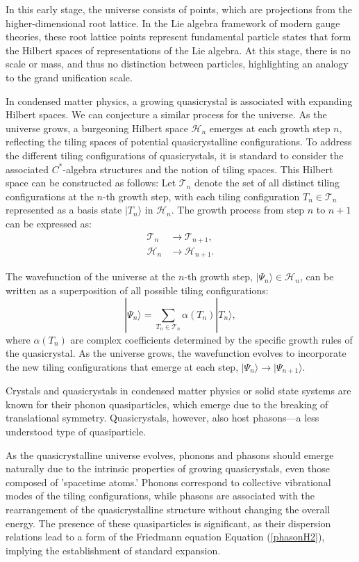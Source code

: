 \documentclass[sn-mathphys-num]{sn-jnl}%
\begin{document}
In this early stage, the universe consists of points, which are projections from the higher-dimensional root lattice. In the Lie algebra framework of modern gauge theories, these root lattice points represent fundamental particle states that form the Hilbert spaces of representations of the Lie algebra. At this stage, there is no scale or mass, and thus no distinction between particles, highlighting an analogy to the grand unification scale.

In condensed matter physics, a growing quasicrystal is associated with expanding Hilbert spaces. We can conjecture a similar process for the universe. As the universe grows, a burgeoning Hilbert space $\mathcal{H}_n$ emerges at each growth step $n$, reflecting the tiling spaces \cite{sadun2018} of potential quasicrystalline configurations. To address the different tiling configurations of quasicrystals, it is standard to consider the associated \( C^* \)-algebra structures \cite{Connes} and the notion of tiling spaces. This Hilbert space can be constructed as follows: Let $\mathcal{T}_n$ denote the set of all distinct tiling configurations at the $n$-th growth step, with each tiling configuration $T_n \in \mathcal{T}_n$ represented as a basis state $|T_n\rangle$ in $\mathcal{H}_n$. The growth process from step $n$ to $n+1$ can be expressed as:
\begin{align}
\mathcal{T}_n &\rightarrow \mathcal{T}_{n+1}, \\
\mathcal{H}_n &\rightarrow \mathcal{H}_{n+1}.
\end{align}

The wavefunction of the universe at the $n$-th growth step, $|\Psi_n\rangle \in \mathcal{H}_n$, can be written as a superposition of all possible tiling configurations:
\begin{equation}
|\Psi_n\rangle = \sum_{T_n \in \mathcal{T}_n} \alpha(T_n) |T_n\rangle,
\end{equation}
where $\alpha(T_n)$ are complex coefficients determined by the specific growth rules of the quasicrystal. As the universe grows, the wavefunction evolves to incorporate the new tiling configurations that emerge at each step, $|\Psi_n\rangle \rightarrow |\Psi_{n+1}\rangle$.


Crystals and quasicrystals in condensed matter physics or solid state systems are known for their phonon quasiparticles, which emerge due to the breaking of translational symmetry. Quasicrystals, however, also host phasons—a less understood type of quasiparticle. 

As the quasicrystalline universe evolves, phonons and phasons should emerge naturally due to the intrinsic properties of growing quasicrystals, even those composed of 'spacetime atoms.' Phonons correspond to collective vibrational modes of the tiling configurations, while phasons are associated with the rearrangement of the quasicrystalline structure without changing the overall energy. The presence of these quasiparticles is significant, as their dispersion relations lead to a form of the Friedmann equation Equation (\ref{phasonH2}), implying the establishment of standard expansion.
\end{document}
